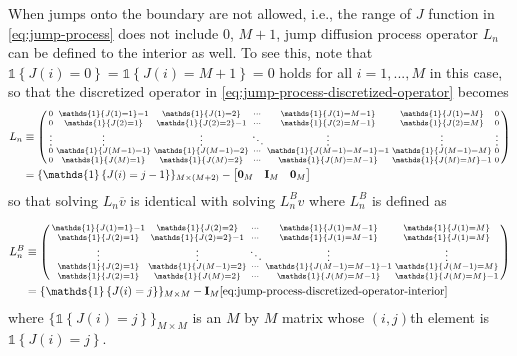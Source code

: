 \documentclass[11pt]{article}
\newcommand{\indicator}[1]{\ensuremath{\mathds{1}\left\{{#1}\right\}}}
\newenvironment{psmallmatrix}
{\left(\begin{smallmatrix}}
	{\end{smallmatrix}\right)}
\theoremstyle{definition}
\begin{document}
When jumps onto the boundary are not allowed, i.e., the range of $J$ function in \eqref{eq:jump-process} does not include $0$, $M+1$,  jump diffusion process operator $L_n$ can be defined to the interior as well. To see this, note that $\indicator{J(i) = 0} = \indicator{J(i) = M+1} = 0$ holds for all $i = 1,..., M$ in this case, so that the discretized operator in \eqref{eq:jump-process-discretized-operator} becomes
\begin{align}
L_n &\equiv \begin{psmallmatrix}
0 & \indicator{J(1) = 1} -1 & \indicator{J(1) = 2} & \cdots & \indicator{J(1) = M-1} & \indicator{J(1) = M} & 0 \\
0 & \indicator{J(2) = 1}  & \indicator{J(2) = 2} - 1 & \cdots & \indicator{J(2) = M-1}  & \indicator{J(2) = M} & 0 \\
\vdots & \vdots & \vdots & \ddots & \vdots & \vdots &\vdots \\
0 & \indicator{J(M-1) = 1}  & \indicator{J(M-1) = 2} & \cdots & \indicator{J(M-1) = M-1} - 1 & \indicator{J(M-1) = M} &0 \\
0 & \indicator{J(M) = 1}  & \indicator{J(M) = 2} & \cdots & \indicator{J(M) = M-1}  & \indicator{J(M) = M} - 1&0
\end{psmallmatrix}
\\
&= \{ \indicator{ J(i) = j-1 } \}_{M \times (M+2)} - \begin{bmatrix} \mathbf{0}_M &\mathbf{I}_M & \mathbf{0}_M  \end{bmatrix}
\end{align}
so that solving $L_n \overline{v} $ is identical with solving $L_n^B v$ where $L_n^B$ is defined as

\begin{align}
L_n^B &\equiv \begin{psmallmatrix}
\indicator{J(1) = 1} -1 & \indicator{J(2) = 2} & \cdots & \indicator{J(1) = M-1} & \indicator{J(1) = M}  \\
 \indicator{J(2) = 1}  & \indicator{J(2) = 2} - 1 & \cdots & \indicator{J(1) = M-1}  & \indicator{J(1) = M}  \\
\vdots & \vdots & \ddots & \vdots & \vdots \\
\indicator{J(2) = 1}  & \indicator{J(M-1) = 2} & \cdots & \indicator{J(M-1) = M-1} - 1 & \indicator{J(M-1) = M}  \\
\indicator{J(2) = 1}  & \indicator{J(M) = 2} & \cdots & \indicator{J(M) = M-1}  & \indicator{J(M) = M} - 1
\end{psmallmatrix}
\\
&= \{ \indicator{ J(i) = j } \}_{M \times M} - \mathbf{I}_M \eqref{eq:jump-process-discretized-operator-interior}
\end{align}
where $\{ \indicator{ J(i) = j } \}_{M \times M} $ is an $M$ by $M$ matrix whose $(i,j)$th element is $ \indicator{ J(i) = j } $.
\end{document}
